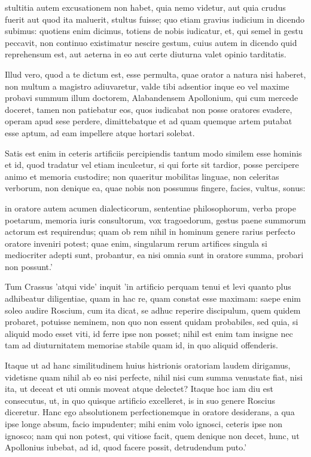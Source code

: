  stultitia autem excusationem non habet, quia nemo videtur, aut quia crudus fuerit aut quod ita maluerit, stultus fuisse; quo etiam gravius iudicium in dicendo subimus: quotiens enim dicimus, totiens de nobis iudicatur, et, qui semel in gestu peccavit, non continuo existimatur nescire gestum, cuius autem in dicendo quid reprehensum est, aut aeterna in eo aut certe diuturna valet opinio tarditatis.

 Illud vero, quod a te dictum est, esse permulta, quae orator a natura nisi haberet, non multum a magistro adiuvaretur, valde tibi adsentior inque eo vel maxime probavi summum illum doctorem, Alabandensem Apollonium, qui cum mercede doceret, tamen non patiebatur eos, quos iudicabat non posse oratores evadere, operam apud sese perdere, dimittebatque et ad quam quemque artem putabat esse aptum, ad eam impellere atque hortari solebat.

 Satis est enim in ceteris artificiis percipiendis tantum modo similem esse hominis et id, quod tradatur vel etiam inculcetur, si qui forte sit tardior, posse percipere animo et memoria custodire; non quaeritur mobilitas linguae, non celeritas verborum, non denique ea, quae nobis non possumus fingere, facies, vultus, sonus:

 in oratore autem acumen dialecticorum, sententiae philosophorum, verba prope poetarum, memoria iuris consultorum, vox tragoedorum, gestus paene summorum actorum est requirendus; quam ob rem nihil in hominum genere rarius perfecto oratore inveniri potest; quae enim, singularum rerum artifices singula si mediocriter adepti sunt, probantur, ea nisi omnia sunt in oratore summa, probari non possunt.'

 Tum Crassus 'atqui vide' inquit 'in artificio perquam tenui et levi quanto plus adhibeatur diligentiae, quam in hac re, quam constat esse maximam: saepe enim soleo audire Roscium, cum ita dicat, se adhuc reperire discipulum, quem quidem probaret, potuisse neminem, non quo non essent quidam probabiles, sed quia, si aliquid modo esset viti, id ferre ipse non posset; nihil est enim tam insigne nec tam ad diuturnitatem memoriae stabile quam id, in quo aliquid offenderis.

 Itaque ut ad hanc similitudinem huius histrionis oratoriam laudem dirigamus, videtisne quam nihil ab eo nisi perfecte, nihil nisi cum summa venustate fiat, nisi ita, ut deceat et uti omnis moveat atque delectet? Itaque hoc iam diu est consecutus, ut, in quo quisque artificio excelleret, is in suo genere Roscius diceretur. Hanc ego absolutionem perfectionemque in oratore desiderans, a qua ipse longe absum, facio impudenter; mihi enim volo ignosci, ceteris ipse non ignosco; nam qui non potest, qui vitiose facit, quem denique non decet, hunc, ut Apollonius iubebat, ad id, quod facere possit, detrudendum puto.'

